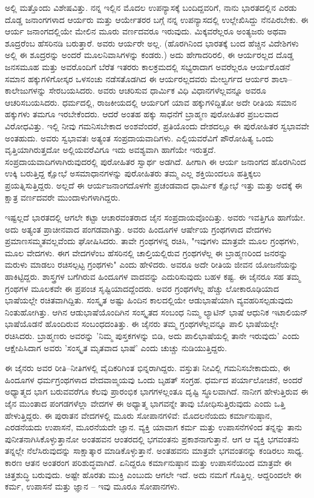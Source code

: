 ಅಲ್ಲಿ ಮತ್ತೊಂದು ವಿಶೇಷವಿತ್ತು. ನನ್ನ ಇಲ್ಲಿನ ಮೊದಲ ಉಪನ್ಯಾಸಕ್ಕೆ ಬಂದಿದ್ದವರಿಗೆ, ನಾನು ಭಾರತದಲ್ಲಿನ ಎರಡು ದೊಡ್ಡ ಜನಾಂಗಗಳಾದ ಆರ್ಯರು ಮತ್ತು ಆರ್ಯೇತರರ ಬಗ್ಗೆ ನನ್ನ ಉಪನ್ಯಾಸದಲ್ಲಿ ಉಲ್ಲೇಖಿಸಿದ್ದು ನೆನಪಿರಬೇಕು. ಈ ಆರ್ಯ ಜನಾಂಗದಲ್ಲಿಯೇ ಮೇಲಿನ ಮೂರು ವರ್ಣದವರೂ ಇರುವುದು. ಮಿಕ್ಕವರೆಲ್ಲರೂ ಅಂತ್ಯಜರು ಅಥವಾ ಶೂದ್ರರೆಂಬ ಹೆಸರಿನಡಿ ಬರುತ್ತಾರೆ. ಅವರು ಆರ್ಯರೇ ಅಲ್ಲ. (ಹೊರಗಿನಿಂದ ಭಾರತಕ್ಕೆ ಬಂದ ಹೆಚ್ಚಿನ ವಿದೇಶಿಗಳು ಅಲ್ಲಿ ಈ ಶೂದ್ರರನ್ನು ಅಂದರೆ ಮೂಲನಿವಾಸಿಗಳನ್ನು ಕಂಡರು.) ಅದು ಹೇಗಾದರಿರಲಿ, ಈ ಆರ್ಯರಲ್ಲದ ದೊಡ್ಡ ಜನಸಮೂಹ ಮತ್ತು ಅವರೊಂದಿಗೆ ಬೆರೆತ ಇತರರು ಕಾಲಕ್ರಮದಲ್ಲಿ ಸಭ್ಯರಾದಾಗ ಅವರೆಲ್ಲರೂ ಆರ್ಯರೊಡನೆ ಸಮಾನ ಹಕ್ಕುಗಳಿಗೋಸ್ಕರ ಒಳಸಂಚು ನಡೆಸತೊಡಗಿದ ಈ ಆರ್ಯರಲ್ಲದವರು ಮೇಲ್ವರ್ಗದ ಆರ್ಯರ ಶಾಲಾ–ಕಾಲೇಜುಗಳನ್ನು ಸೇರಬಯಸಿದರು. ಅವರು ಆಚರಿಸುವ ಧಾರ್ಮಿಕ ವಿಧಿ ವಿಧಾನಗಳೆಲ್ಲವನ್ನೂ ಅವರೂ ಆಚರಿಸಬಯಸಿದರು. ಧರ್ಮದಲ್ಲಿ, ರಾಜಕೀಯದಲ್ಲಿ ಆರ್ಯರಿಗೆ ಯಾವ ಹಕ್ಕುಗಳಿದ್ದಿತೋ ಅದೇ ರೀತಿಯ ಸಮಾನ ಹಕ್ಕುಗಳು ತಮಗೂ ಇರಬೇಕೆಂದರು. ಆದರೆ ಅಂತಹ ಹಕ್ಕು ಸಾಧನೆಗೆ ಬ್ರಾಹ್ಮಣ ಪುರೋಹಿತರ ಪ್ರಬಲವಾದ ವಿರೋಧವಿತ್ತು. ಇಲ್ಲಿ ನೀವು ಗಮನಿಸಬೇಕಾದ ಅಂಶವೆಂದರೆ, ಪ್ರತಿಯೊಂದು ದೇಶದಲ್ಲೂ ಈ ಪುರೋಹಿತರ ಸ್ವಭಾವವೇ ಅಂತಹುದು. ಅವರು ಸ್ವಭಾವತಃ ಅತ್ಯಂತ ಸಂಪ್ರದಾಯವಾದಿಗಳು. ಎಲ್ಲಿಯವರೆವಿಗೆ ಪೌರೋಹಿತ್ಯ ಒಂದು ವೃತ್ತಿಯಾಗಿರುತ್ತದೋ ಅಲ್ಲಿಯವರೆವಿಗೂ ಇದು ಅವಶ್ಯವಾಗಿ ಹಾಗೆಯೇ ಇರುತ್ತದೆ. ಸಂಪ್ರದಾಯವಾದಿಗಳಾಗಿರುವುದರಲ್ಲಿ ಪುರೋಹಿತರ ಸ್ವಾರ್ಥ ಅಡಗಿದೆ. ಹೀಗಾಗಿ ಈ ಆರ್ಯ ಜನಾಂಗದ ಹೊರಗಿನಿಂದ ಉಕ್ಕಿ ಬರುತ್ತಿದ್ದ ಕ್ಷೋಭೆ ಅಸಮಾಧಾನಗಳನ್ನು ಪುರೋಹಿತರು ತಮ್ಮ ಎಲ್ಲ ಶಕ್ತಿಯಿಂದಲೂ ಹತ್ತಿಕ್ಕಲು ಪ್ರಯತ್ನಿಸುತ್ತಿದ್ದರು. ಅಲ್ಲದೆ ಈ ಆರ್ಯಜನಾಂಗದೊಳಗೇ ಪ್ರಚಂಡವಾದ ಧಾರ್ಮಿಕ ಕ್ಷೋಭೆ ಇತ್ತು ಮತ್ತು ಅದಕ್ಕೆ ಈ ಕ್ಷಾತ್ರ ವರ್ಣದವರೇ ಮುಂದಾಳುಗಳಾಗಿದ್ದರು.

ಇಷ್ಟಲ್ಲದೆ ಭಾರತದಲ್ಲಿ ಆಗಲೇ ಕಟ್ಟಾ ಆಚಾರವಂತರಾದ ಜೈನ ಸಂಪ್ರದಾಯವೊಂದಿತ್ತು. ಅವರು ಇವತ್ತಿಗೂ ಹಾಗೆಯೇ. ಅದು ಅತ್ಯಂತ ಪ್ರಾಚೀನವಾದ ಪಂಗಡವಾಗಿತ್ತು. ಅವರು ಹಿಂದೂಗಳ ಆರ್ಷೇಯ ಗ್ರಂಥಗಳಾದ ವೇದಗಳು ಪ್ರಮಾಣಸಮ್ಮತವಲ್ಲವೆಂದು ಘೋಷಿಸಿದರು. ತಾವೇ ಗ್ರಂಥಗಳನ್ನ ರಚಿಸಿ, "ಇವುಗಳು ಮಾತ್ರವೇ ಮೂಲ ಗ್ರಂಥಗಳು, ಮೂಲ ವೇದಗಳು. ಈಗ ವೇದಗಳೆಂಬ ಹೆಸರಿನಲ್ಲಿ ಚಾಲ್ತಿಯಲ್ಲಿರುವ ಗ್ರಂಥಗಳೆಲ್ಲ ಈ ಬ್ರಾಹ್ಮಣರಿಂದ ಜನರನ್ನು ಮರುಳು ಮಾಡಲು ರಚಿಸಲ್ಪಟ್ಟ ಗ್ರಂಥಗಳು" ಎಂದು ಹೇಳಿದರು. ಅವರೂ ಅದೇ ರೀತಿಯ ಜೀವನ ಯೋಜನೆಯನ್ನು ಹಾಕಿಟ್ಟಿದ್ದರು. ಶಾಸ್ತ್ರಗಳ ಬಗೆಗಿರುವ ಹಿಂದೂಗಳ ವಾದವನ್ನು ಎದುರಿಸುವುದು ಬಹಳ ಕಷ್ಟ. ಈ ಜೈನರೂ ಸಹ ತಮ್ಮ ಗ್ರಂಥಗಳ ಮೂಲಕವೇ ಈ ಪ್ರಪಂಚ ಸೃಷ್ಟಿಯಾದದ್ದೆಂದರು. ಅವರ ಗ್ರಂಥಗಳೆಲ್ಲ ಹೆಚ್ಚು ಲೋಕಾರೂಢಿಯಾದ ಭಾಷೆಯಲ್ಲೇ ರಚಿತವಾಗಿದ್ದಿತು. ಸಂಸ್ಕೃತ ಅಷ್ಟು ಹಿಂದಿನ ಕಾಲದಲ್ಲಿಯೇ ಆಡುಭಾಷೆಯಾಗಿ ವ್ಯವಹರಿಸಲ್ಪಡುವುದು ನಿಂತುಹೋಗಿತ್ತು. ಆಗಿನ ಆಡುಭಾಷೆಯೊಂದಿಗಿನ ಸಂಸ್ಕೃತದ ಸಂಬಂಧ ನಿಮ್ಮ ಲ್ಯಾಟಿನ್ ಭಾಷೆ ಆಧುನಿಕ ಇಟಾಲಿಯನ್ ಭಾಷೆಯೊಡನೆ ಹೊಂದಿರುವ ಸಂಬಂಧದಂತಿತ್ತು. ಈ ಜೈನರು ತಮ್ಮ ಗ್ರಂಥಗಳೆಲ್ಲವನ್ನೂ ಪಾಲಿ ಭಾಷೆಯಲ್ಲೇ ರಚಿಸಿದರು. ಬ್ರಾಹ್ಮಣರು ಅವರನ್ನು 'ನಿಮ್ಮ ಪುಸ್ತಕಗಳನ್ನು ಬಿಡಿ, ಅದು ಪಾಲಿಭಾಷೆಯಲ್ಲಿ ತಾನೇ ಇರುವುದು' ಎಂದು ಆಕ್ಷೇಪಿಸಿದಾಗ ಅವರು 'ಸಂಸ್ಕೃತ ಮೃತವಾದ ಭಾಷೆ' ಎಂದು ಚುಚ್ಚು ನುಡಿಯುತ್ತಿದ್ದರು.

ಈ ಜೈನರು ಅವರ ರೀತಿ–ನೀತಿಗಳಲ್ಲಿ ವೈದಿಕರಿಗಿಂತ ಭಿನ್ನರಾಗಿದ್ದರು. ವಸ್ತುತಃ ನೀವಿಲ್ಲಿ ಗಮನಿಸಬೇಕಾದುದು, ಈ ಹಿಂದೂಗಳ ಧರ್ಮಗ್ರಂಥಗಳಾದ ವೇದವಾಙ್ಮಯವು ಒಂದು ಬೃಹತ್ ಸಂಗ್ರಹ. ಧರ್ಮದ ಪರ್ಯಾಲೋಚನೆ, ಅಂದರೆ ಅಧ್ಯಾತ್ಮದ ಭಾಗ ಬರುವವರೆಗೂ ಕೆಲವು ಪ್ರಾರಂಭಿಕ ಭಾಗಗಳಲ್ಲಂತೂ ದೃಷ್ಟಿ ಸ್ಥೂಲವಾಗಿದೆ. ನಾನೀಗ ಹೇಳುತ್ತಿರುವ ಈ ಜೈನ ಮುಂತಾದ ಪಂಗಡಗಳೆಲ್ಲಾ ವೇದಗಳ ಈ ಅಧ್ಯಾತ್ಮ ಭಾಗವನ್ನೇ ತಾವು ಬೋಧಿಸುತ್ತಿರುವುದು ಎಂದು ಒತ್ತಿ ಹೇಳುತ್ತಿದ್ದರು. ಈ ಪುರಾತನ ವೇದಗಳಲ್ಲಿ ಮೂರು ಸೋಪಾನಗಳಿವೆ: ಮೊದಲನೆಯದು ಕರ್ಮಾನುಷ್ಠಾನ, ಎರಡನೆಯದು ಉಪಾಸನೆ, ಮೂರನೆಯದೇ ಜ್ಞಾನ. ವ್ಯಕ್ತಿ ಯಾವಾಗ ಕರ್ಮ ಮತ್ತು ಉಪಾಸನೆಗಳಿಂದ ತನ್ನನ್ನು ತಾನು ಪುನೀತನಾಗಿಸಿಕೊಳ್ಳುತ್ತಾನೋ ಅಂತಹವನ ಆಂತರದಲ್ಲಿ ಭಗವಂತನು ಪ್ರಕಾಶನಾಗುತ್ತಾನೆ. ಆಗ ಆ ವ್ಯಕ್ತಿ ಭಗವಂತನು ತನ್ನಲ್ಲೇ ನೆಲೆಸಿರುವುದನ್ನು ಸಾಕ್ಷಾತ್ಕಾರ ಮಾಡಿಕೊಳ್ಳುತ್ತಾನೆ. ಅಂತಹವನು ಮಾತ್ರವೇ ಭಗವಂತನನ್ನು ಕಂಡಿರಲು ಸಾಧ್ಯ. ಕಾರಣ ಆತನ ಅಂತರಂಗ ಪರಿಶುದ್ಧವಾಗಿದೆ. ಏನಿದ್ದರೂ ಕರ್ಮಾನುಷ್ಠಾನ ಮತ್ತು ಉಪಾಸನೆಯಿಂದ ಮಾತ್ರವೇ ಈ ಚಿತ್ತಶುದ್ಧಿ ಬರುವುದು. ಅಷ್ಟೇ ಹೊರತು ಮುಕ್ತಿ ಎಂಬುದು ಆಗಲೇ ಇದೆ. ಅದು ನಮಗೆ ಗೊತ್ತಿಲ್ಲ. ಆದ್ದರಿಂದಲೇ ಈ ಕರ್ಮ, ಉಪಾಸನೆ ಮತ್ತು ಜ್ಞಾನ – ಇವು ಮೂರೂ ಸೋಪಾನಗಳು.

